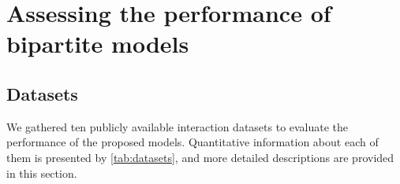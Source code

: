 \section{Assessing the performance of bipartite models}
\label{sec:experiments}

\subsection{Datasets}
\label{sec:datasets}

We gathered ten publicly available interaction datasets to evaluate the performance of the proposed models. Quantitative information about each of them is presented by \autoref{tab:datasets}, and more detailed descriptions are provided in this section.

